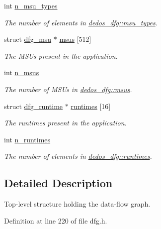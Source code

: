 \begin{DoxyCompactItemize}
int \hyperlink{structdedos__dfg_ac78a52257324eec0ccf425530c84e91a}{n\-\_\-msu\-\_\-types}
\begin{DoxyCompactList}\small\item\em The number of elements in \hyperlink{structdedos__dfg_a6413c359339136a9acaf77df3b897305}{dedos\-\_\-dfg\-::msu\-\_\-types}. \end{DoxyCompactList}\item 
struct \hyperlink{structdfg__msu}{dfg\-\_\-msu} $\ast$ \hyperlink{structdedos__dfg_a5177dba1dea7f8f2fb383c5839c5f5f7}{msus} \mbox{[}512\mbox{]}
\begin{DoxyCompactList}\small\item\em The M\-S\-Us present in the application. \end{DoxyCompactList}\item 
int \hyperlink{structdedos__dfg_ad2f0a4385c8adcb46e74c872fdbed428}{n\-\_\-msus}
\begin{DoxyCompactList}\small\item\em The number of M\-S\-Us in \hyperlink{structdedos__dfg_a5177dba1dea7f8f2fb383c5839c5f5f7}{dedos\-\_\-dfg\-::msus}. \end{DoxyCompactList}\item 
struct \hyperlink{structdfg__runtime}{dfg\-\_\-runtime} $\ast$ \hyperlink{structdedos__dfg_a90ca69ed86b7f3d3286e4cdd4ddcae7f}{runtimes} \mbox{[}16\mbox{]}
\begin{DoxyCompactList}\small\item\em The runtimes present in the application. \end{DoxyCompactList}\item 
int \hyperlink{structdedos__dfg_ad222786891e1415cff70c46f083992df}{n\-\_\-runtimes}
\begin{DoxyCompactList}\small\item\em The number of elements in \hyperlink{structdedos__dfg_a90ca69ed86b7f3d3286e4cdd4ddcae7f}{dedos\-\_\-dfg\-::runtimes}. \end{DoxyCompactList}\end{DoxyCompactItemize}


\subsection{Detailed Description}
Top-\/level structure holding the data-\/flow graph. 

Definition at line 220 of file dfg.\-h.



